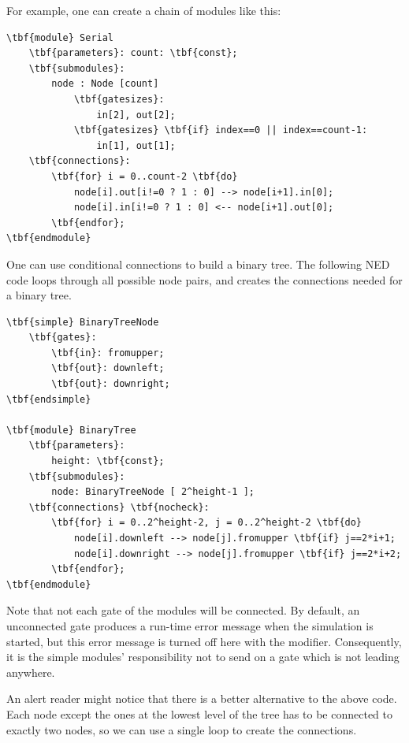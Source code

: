 

For example, one can create a chain of modules like this:


\begin{Verbatim}[commandchars=\\\{\}]
\tbf{module} Serial
    \tbf{parameters}: count: \tbf{const};
    \tbf{submodules}:
        node : Node [count]
            \tbf{gatesizes}:
                in[2], out[2];
            \tbf{gatesizes} \tbf{if} index==0 || index==count-1:
                in[1], out[1];
    \tbf{connections}:
        \tbf{for} i = 0..count-2 \tbf{do}
            node[i].out[i!=0 ? 1 : 0] --> node[i+1].in[0];
            node[i].in[i!=0 ? 1 : 0] <-- node[i+1].out[0];
        \tbf{endfor};
\tbf{endmodule}
\end{Verbatim}




One can use conditional connections to build a binary tree.
The following NED code loops through all possible node pairs, and
creates the connections needed for a binary tree.

\begin{Verbatim}[commandchars=\\\{\}]
\tbf{simple} BinaryTreeNode
    \tbf{gates}:
        \tbf{in}: fromupper;
        \tbf{out}: downleft;
        \tbf{out}: downright;
\tbf{endsimple}

\tbf{module} BinaryTree
    \tbf{parameters}:
        height: \tbf{const};
    \tbf{submodules}:
        node: BinaryTreeNode [ 2^height-1 ];
    \tbf{connections} \tbf{nocheck}:
        \tbf{for} i = 0..2^height-2, j = 0..2^height-2 \tbf{do}
            node[i].downleft --> node[j].fromupper \tbf{if} j==2*i+1;
            node[i].downright --> node[j].fromupper \tbf{if} j==2*i+2;
        \tbf{endfor};
\tbf{endmodule}
\end{Verbatim}

Note that not each gate of the modules will be connected. By default,
an unconnected gate produces a run-time error message when the
simulation is started, but this error message is turned off here with
the  modifier.  Consequently, it
is the simple modules' responsibility not to send on a gate which is
not leading anywhere.

An alert reader might notice that there is a better alternative
to the above code. Each node except the ones at the lowest level
of the tree has to be connected to exactly two nodes,
so we can use a single loop to create the connections.

